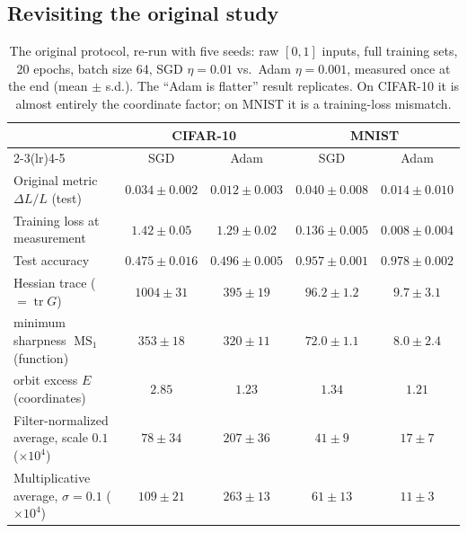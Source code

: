 \documentclass[10pt]{article}
\theoremstyle{remark}
\newcommand{\tr}{\operatorname{tr}}
\newcommand{\MS}{\operatorname{MS}}
\begin{document}
\subsection{Revisiting the original study}\label{sec:replication}
\begin{table}[t]
\centering
\small
\caption{The original protocol, re-run with five seeds: raw $[0,1]$ inputs, full training sets, 20 epochs, batch size 64, SGD $\eta=0.01$ vs.\ Adam $\eta=0.001$, measured once at the end (mean $\pm$ s.d.). The ``Adam is flatter'' result replicates. On CIFAR-10 it is almost entirely the coordinate factor; on MNIST it is a training-loss mismatch.}
\label{tab:replication}
\setlength{\tabcolsep}{5pt}
\begin{tabular}{lcccc}
\toprule
& \multicolumn{2}{c}{CIFAR-10} & \multicolumn{2}{c}{MNIST}\\
\cmidrule(lr){2-3}\cmidrule(lr){4-5}
& SGD & Adam & SGD & Adam\\
\midrule
Original metric $\Delta L/L$ (test) & $0.034\pm0.002$ & $0.012\pm0.003$ & $0.040\pm0.008$ & $0.014\pm0.010$\\
Training loss at measurement & $1.42\pm0.05$ & $1.29\pm0.02$ & $0.136\pm0.005$ & $0.008\pm0.004$\\
Test accuracy & $0.475\pm0.016$ & $0.496\pm0.005$ & $0.957\pm0.001$ & $0.978\pm0.002$\\
Hessian trace ($=\tr G$) & $1004\pm31$ & $395\pm19$ & $96.2\pm1.2$ & $9.7\pm3.1$\\
\quad minimum sharpness $\MS_1$ (function) & $353\pm18$ & $320\pm11$ & $72.0\pm1.1$ & $8.0\pm2.4$\\
\quad orbit excess $E$ (coordinates) & $2.85$ & $1.23$ & $1.34$ & $1.21$\\
Filter-normalized average, scale $0.1$ ($\times10^{4}$) & $78\pm34$ & $207\pm36$ & $41\pm9$ & $17\pm7$\\
Multiplicative average, $\sigma=0.1$ ($\times10^{4}$) & $109\pm21$ & $263\pm13$ & $61\pm13$ & $11\pm3$\\
\bottomrule
\end{tabular}
\end{table}
\end{document}
